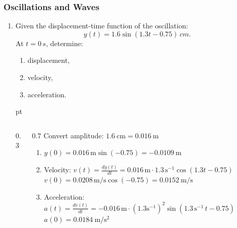 \documentclass[t,aspectratio=169]{beamer}
\begin{document}
\begin{frame}
\frametitle{Oscillations and Waves}

\begin{enumerate}

\item  Given the displacement-time function of the oscillation:  
$$y(t) = 1.6 \sin(1.3t - 0.75)\,cm. $$ 
At $t=0\,s$, determine:
\begin{enumerate}
\item[a)] displacement,
\item[b)] velocity,
\item[c)] acceleration.
\end{enumerate}

 pt
\begin{columns}
  \begin{column}{0.3\linewidth}
    \vfill
\begin{center}
\end{center}
\end{column}
\begin{column}{0.7\linewidth}
Convert amplitude: $1.6\ \mathrm{cm} = 0.016\ \mathrm{m}$  
\begin{enumerate}
\item[a)] $y(0) = 0.016\,\mathrm{m}\sin(-0.75) = -0.0109\ \mathrm{m}$  
\item[b)] Velocity: $v(t) = \frac{dy(t)}{dt} = 0.016\,\mathrm{m} \cdot 1.3\,\mathrm{s^{-1}}\cos(1.3t - 0.75)$  
$v(0) = 0.0208\,\mathrm{m/s}\cos(-0.75) = 0.0152\ \mathrm{m/s}$  
\item[c)] Acceleration: $a(t) =  \frac{dv(t)}{dt} = -0.016\,\mathrm{m} \cdot (1.3\mathrm{s^{-1}})^2 \sin(1.3\,\mathrm{s^{-1}}\,t - 0.75) $  
  $a(0) = 0.0184\ \mathrm{m/s^2}$
\end{enumerate}
\end{column}
\end{columns}


\end{enumerate}
\end{frame}
\end{document}
